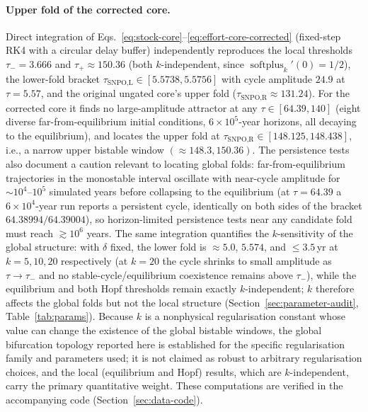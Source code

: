\documentclass[twocolumn,10pt]{article}
\begin{document}
\paragraph{Upper fold of the corrected core.} Direct integration of Eqs.~\eqref{eq:stock-core}--\eqref{eq:effort-core-corrected} (fixed-step RK4 with a circular delay buffer) independently reproduces the local thresholds $\tau_-=3.666$ and $\tau_+\approx150.36$ (both $k$-independent, since $\operatorname{softplus}_k'(0)=1/2$), the lower-fold bracket $\tau_{\text{SNPO,L}}\in[5.5738,5.5756]$ with cycle amplitude $24.9$ at $\tau=5.57$, and the original ungated core's upper fold ($\tau_{\text{SNPO,R}}\approx131.24$). For the corrected core it finds no large-amplitude attractor at any $\tau\in[64.39,140]$ (eight diverse far-from-equilibrium initial conditions, $6\times10^5$-year horizons, all decaying to the equilibrium), and locates the upper fold at $\tau_{\text{SNPO,R}}\in[148.125,148.438]$, i.e., a narrow upper bistable window $(\approx148.3,150.36)$. The persistence tests also document a caution relevant to locating global folds: far-from-equilibrium trajectories in the monostable interval oscillate with near-cycle amplitude for $\sim10^4$--$10^5$ simulated years before collapsing to the equilibrium (at $\tau=64.39$ a $6\times10^4$-year run reports a persistent cycle, identically on both sides of the bracket $64.38994/64.39004$), so horizon-limited persistence tests near any candidate fold must reach $\gtrsim10^6$ years. The same integration quantifies the $k$-sensitivity of the global structure: with $\delta$ fixed, the lower fold is $\approx5.0$, $5.574$, and $\le3.5$\,yr at $k=5,10,20$ respectively (at $k=20$ the cycle shrinks to small amplitude as $\tau\to\tau_-$ and no stable-cycle/equilibrium coexistence remains above $\tau_-$), while the equilibrium and both Hopf thresholds remain exactly $k$-independent; $k$ therefore affects the global folds but not the local structure (Section~\ref{sec:parameter-audit}, Table~\ref{tab:params}). Because $k$ is a nonphysical regularisation constant whose value can change the existence of the global bistable windows, the global bifurcation topology reported here is established for the specific regularisation family and parameters used; it is not claimed as robust to arbitrary regularisation choices, and the local (equilibrium and Hopf) results, which are $k$-independent, carry the primary quantitative weight. These computations are verified in the accompanying code (Section~\ref{sec:data-code}).
\end{document}
